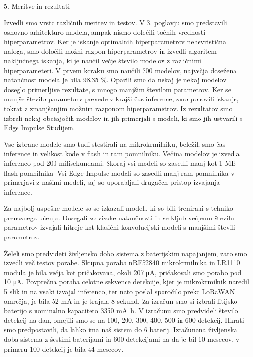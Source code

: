 {5. Meritve in rezultati 

Izvedli smo vrsto različnih meritev in testov.
V 3. poglavju smo predstavili osnovno arhitekturo modela, ampak nismo določili točnih vrednosti hiperparametrov.
Ker je iskanje optimalnih hiperparametrov nehevristična naloga, smo določili možni razpon hiperparametrov in izvedli algoritem naključnega iskanja, ki je naučil večje število modelov z različnimi hiperparameteri.
V prvem koraku smo naučili 300 modelov, največja dosežena natančnost modela je bila 98.35 \%.
Opazili smo da nekaj je nekaj modelov doseglo primerljive rezultate, s mnogo manjšim številom parametrov.
Ker se manjše število parametorv prevede v krajši čas inference, smo ponovili iskanje, tokrat z zmanjšanjim možnim razponom hiperparametrov.
Iz rezultatov smo izbrali nekaj obetajočih modelov in jih primerjali s modeli, ki smo jih ustvarili s Edge Impulse Studijem.

Vse izbrane modele smo tudi stestirali na mikrokrmilniku, beležili smo čas inference in velikost kode v flash in ram pomnilniku.
Večina modelov je izvedla inferenco pod 200 milisekundami.
Skoraj vsi modeli so zasedli manj kot 1 MB flash pomnilnika. 
Vsi Edge Impulse modeli so zasedli manj ram pomnilnika v primerjavi z našimi modeli, saj so uporabljali drugačen pristop izvajanja inference.

Za najbolj uspešne modele so se izkazali modeli, ki so bili trenirani s tehniko prenosnega učenja.
Dosegali so visoke natančnosti in se kljub večjemu številu parametrov izvajali hitreje kot klasični konvolucijski modeli s manjšimi števili parametrov.

Želeli smo predvideti življensko dobo sistema z baterijskim napajanjem, zato smo izvedli več testov porabe.
Skupna poraba nRF52840 mikrokrmilnika in LR1110 modula je bila večja kot pričakovana, okoli 207 \si{\micro\ampere}, pričakovali smo porabo pod 10 \si{\micro\ampere}.
Povprečna poraba celotne sekvence detekcije, kjer je mikrokrmilnik naredil 5 slik in na vsaki izvajal inferenco, ter nato poslal sporočilo preko LoRaWAN omrečja, je bila 52 \si{\milli\ampere} in je trajala 8 sekund.
Za izračun smo si izbrali litijsko baterijo s nominalno kapaciteto 3350 \si{\milli\ampere\hour}.
V izračunu smo predvideli število detekcij na dan, omejili smo se na 100, 200, 300, 400, 500 in 600 detekcij.
Hkrati smo predpostavili, da lahko ima naš sistem do 6 baterij.
Izračunana življenska doba sistema z šestimi baterijami in 600 detekcijami na da je bil 10 mesecov, v primeru 100 detekcij je bila 44 mesecov.


}
